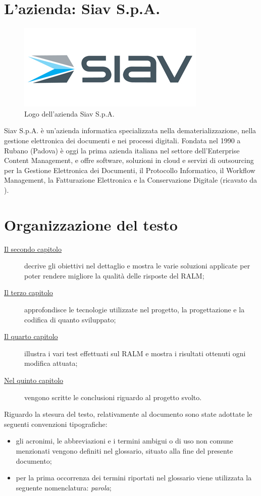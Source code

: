 \section{L'azienda: Siav S.p.A.}

\begin{figure}[!h] 
    \centering 
    \includegraphics[width=0.5\columnwidth]{images/logoSiav.jpg} 
    \caption{Logo dell'azienda Siav S.p.A.}
\end{figure}
\noindent Siav S.p.A. è un’azienda informatica specializzata nella dematerializzazione, nella gestione elettronica dei documenti e nei processi digitali.
Fondata nel 1990 a Rubano (Padova) è oggi la prima azienda italiana nel settore dell’Enterprise Content Management, e offre software, soluzioni in cloud e servizi di outsourcing per la Gestione Elettronica dei Documenti, il Protocollo Informatico, il Workflow Management, la Fatturazione Elettronica e la Conservazione Digitale
(ricavato da \cite{site:siav-spa}).


\section{Organizzazione del testo}

\begin{description}
    \item[{\hyperref[cap:analisi-preliminare]{Il secondo capitolo}}] decrive gli obiettivi nel dettaglio e mostra le varie soluzioni applicate per poter rendere migliore la qualità delle risposte del RALM;
    
    \item[{\hyperref[cap:progettazione-codifica]{Il terzo capitolo}}] approfondisce le tecnologie utilizzate nel progetto, la progettazione e la codifica di quanto sviluppato;
    
    \item[{\hyperref[cap:verifica-validazione]{Il quarto capitolo}}] illustra i vari test effettuati sul RALM e mostra i risultati ottenuti ogni modifica attuata;
    
    \item[{\hyperref[cap:conclusioni]{Nel quinto capitolo}}] vengono scritte le conclusioni riguardo al progetto svolto.
\end{description}

Riguardo la stesura del testo, relativamente al documento sono state adottate le seguenti convenzioni tipografiche:
\begin{itemize}
	\item gli acronimi, le abbreviazioni e i termini ambigui o di uso non comune menzionati vengono definiti nel glossario, situato alla fine del presente documento; 
	\item per la prima occorrenza dei termini riportati nel glossario viene utilizzata la seguente nomenclatura: \emph{parola}\glsfirstoccur;
\end{itemize}
